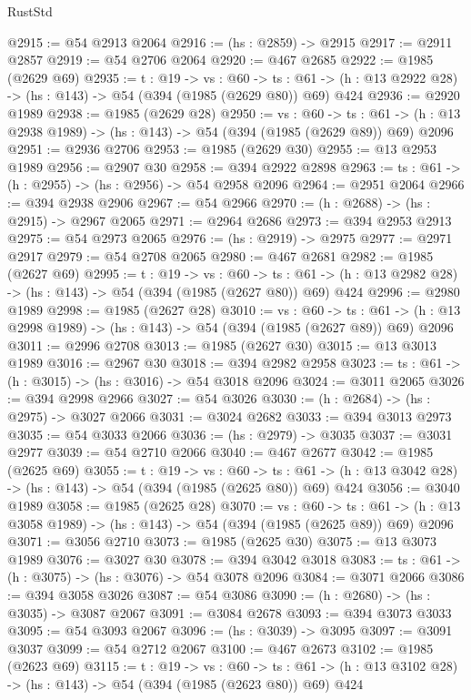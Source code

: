 \begin{lexlean}{RustStd}
\begin{coremodule}
@2915 := @54 @2913 @2064
@2916 := (hs : @2859) -> @2915
@2917 := @2911 @2857
@2919 := @54 @2706 @2064
@2920 := @467 @2685
@2922 := @1985 (@2629 @69)
@2935 := {t : @19} ->
  {vs : @60} ->
  {ts : @61} -> (h : @13 @2922 @28) -> (hs : @143) -> @54 (@394 (@1985 (@2629 @80)) @69) @424
@2936 := @2920 @1989
@2938 := @1985 (@2629 @28)
@2950 := {vs : @60} ->
  {ts : @61} -> (h : @13 @2938 @1989) -> (hs : @143) -> @54 (@394 (@1985 (@2629 @89)) @69) @2096
@2951 := @2936 @2706
@2953 := @1985 (@2629 @30)
@2955 := @13 @2953 @1989
@2956 := @2907 @30
@2958 := @394 @2922 @2898
@2963 := {ts : @61} -> (h : @2955) -> (hs : @2956) -> @54 @2958 @2096
@2964 := @2951 @2064
@2966 := @394 @2938 @2906
@2967 := @54 @2966
@2970 := (h : @2688) -> (hs : @2915) -> @2967 @2065
@2971 := @2964 @2686
@2973 := @394 @2953 @2913
@2975 := @54 @2973 @2065
@2976 := (hs : @2919) -> @2975
@2977 := @2971 @2917
@2979 := @54 @2708 @2065
@2980 := @467 @2681
@2982 := @1985 (@2627 @69)
@2995 := {t : @19} ->
  {vs : @60} ->
  {ts : @61} -> (h : @13 @2982 @28) -> (hs : @143) -> @54 (@394 (@1985 (@2627 @80)) @69) @424
@2996 := @2980 @1989
@2998 := @1985 (@2627 @28)
@3010 := {vs : @60} ->
  {ts : @61} -> (h : @13 @2998 @1989) -> (hs : @143) -> @54 (@394 (@1985 (@2627 @89)) @69) @2096
@3011 := @2996 @2708
@3013 := @1985 (@2627 @30)
@3015 := @13 @3013 @1989
@3016 := @2967 @30
@3018 := @394 @2982 @2958
@3023 := {ts : @61} -> (h : @3015) -> (hs : @3016) -> @54 @3018 @2096
@3024 := @3011 @2065
@3026 := @394 @2998 @2966
@3027 := @54 @3026
@3030 := (h : @2684) -> (hs : @2975) -> @3027 @2066
@3031 := @3024 @2682
@3033 := @394 @3013 @2973
@3035 := @54 @3033 @2066
@3036 := (hs : @2979) -> @3035
@3037 := @3031 @2977
@3039 := @54 @2710 @2066
@3040 := @467 @2677
@3042 := @1985 (@2625 @69)
@3055 := {t : @19} ->
  {vs : @60} ->
  {ts : @61} -> (h : @13 @3042 @28) -> (hs : @143) -> @54 (@394 (@1985 (@2625 @80)) @69) @424
@3056 := @3040 @1989
@3058 := @1985 (@2625 @28)
@3070 := {vs : @60} ->
  {ts : @61} -> (h : @13 @3058 @1989) -> (hs : @143) -> @54 (@394 (@1985 (@2625 @89)) @69) @2096
@3071 := @3056 @2710
@3073 := @1985 (@2625 @30)
@3075 := @13 @3073 @1989
@3076 := @3027 @30
@3078 := @394 @3042 @3018
@3083 := {ts : @61} -> (h : @3075) -> (hs : @3076) -> @54 @3078 @2096
@3084 := @3071 @2066
@3086 := @394 @3058 @3026
@3087 := @54 @3086
@3090 := (h : @2680) -> (hs : @3035) -> @3087 @2067
@3091 := @3084 @2678
@3093 := @394 @3073 @3033
@3095 := @54 @3093 @2067
@3096 := (hs : @3039) -> @3095
@3097 := @3091 @3037
@3099 := @54 @2712 @2067
@3100 := @467 @2673
@3102 := @1985 (@2623 @69)
@3115 := {t : @19} ->
  {vs : @60} ->
  {ts : @61} -> (h : @13 @3102 @28) -> (hs : @143) -> @54 (@394 (@1985 (@2623 @80)) @69) @424

\end{coremodule}
\end{lexlean}
